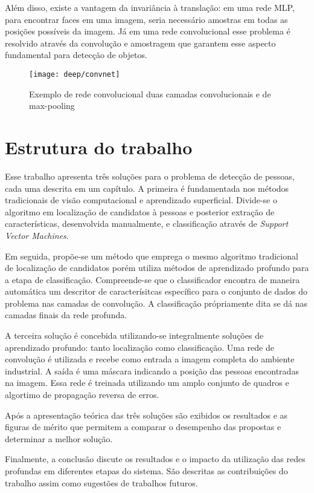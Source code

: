 Além disso, existe a vantagem da invariância à translação: em uma rede MLP, para encontrar faces em uma imagem, seria necessário amostras em todas as posições possíveis da imagem. Já em uma rede convolucional esse problema é resolvido através da convolução e amostragem que garantem esse aspecto fundamental para detecção de objetos.

\begin{figure}[h]
\centering
\texttt{[image: deep/convnet]}
\caption{Exemplo de rede convolucional duas camadas convolucionais e de max-pooling}
\label{fig:convnet}
\end{figure}

\section{Estrutura do trabalho}
Esse trabalho apresenta três soluções para o problema de detecção de pessoas, cada uma descrita em um capítulo. A primeira é fundamentada nos métodos tradicionais de visão computacional e aprendizado superficial. Divide-se o algoritmo em localização de candidatos à pessoas e posterior extração de características, desenvolvida manualmente, e classificação através de \textit{Support Vector Machines}.

Em seguida, propõe-se um método que emprega o mesmo algoritmo tradicional de localização de candidatos porém utiliza métodos de aprendizado profundo para a etapa de classificação. Compreende-se que o classificador encontra de maneira automática um descritor de caracterísitcas específico para o conjunto de dados do problema nas camadas de convolução. A classificação própriamente dita se dá nas camadas finais da rede profunda.

A terceira solução é concebida utilizando-se integralmente soluções de aprendizado profundo: tanto localização como classificação. Uma rede de convolução é utilizada e recebe como entrada a imagem completa do ambiente industrial. A saída é uma máscara indicando a posição das pessoas encontradas na imagem. Essa rede é treinada utilizando um amplo conjunto de quadros e algortimo de propagação reversa de erros.

Após a apresentação teórica das três soluções são exibidos os resultados e as figuras de mérito que permitem a comparar o desempenho das propostas e determinar a melhor solução.

Finalmente, a conclusão discute os resultados e o impacto da utilização das redes profundas em diferentes etapas do sistema. São descritas as contribuições do trabalho assim como sugestões de trabalhos futuros.



